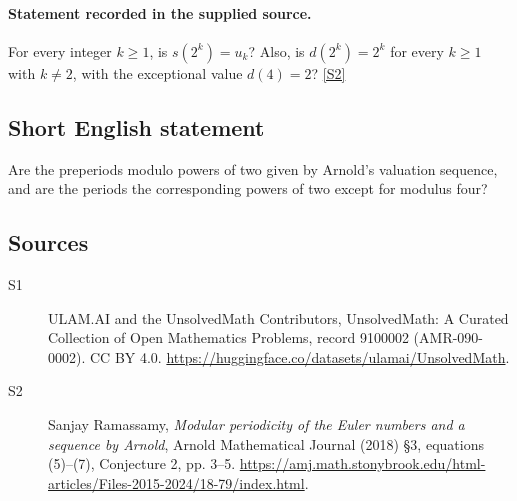 \documentclass[11pt]{article}
\newcommand{\sref}[2]{\hyperlink{source:#1:#2}{[S#2]}}
\begin{document}
\paragraph{Statement recorded in the supplied source.}
For every integer $k\ge1$, is $s(2^k)=u_k$? Also, is $d(2^k)=2^k$ for every $k\ge1$ with $k\ne2$, with the exceptional value $d(4)=2$? \sref{9100002}{2}
\subsection{Short English statement}
Are the preperiods modulo powers of two given by Arnold's valuation sequence, and are the periods the corresponding powers of two except for modulus four?
\subsection{Sources}
\begin{description}
\item[\hypertarget{source:9100002:1}{S1}] ULAM.AI and the UnsolvedMath Contributors, UnsolvedMath: A Curated Collection of Open Mathematics Problems, record 9100002 (AMR-090-0002). CC BY 4.0. \url{https://huggingface.co/datasets/ulamai/UnsolvedMath}.
\item[\hypertarget{source:9100002:2}{S2}] Sanjay Ramassamy, \emph{Modular periodicity of the Euler numbers and a sequence by Arnold}, Arnold Mathematical Journal (2018) \S3, equations (5)--(7), Conjecture 2, pp. 3--5. \url{https://amj.math.stonybrook.edu/html-articles/Files-2015-2024/18-79/index.html}.
\end{description}
\label{end:9100002}
\end{document}
